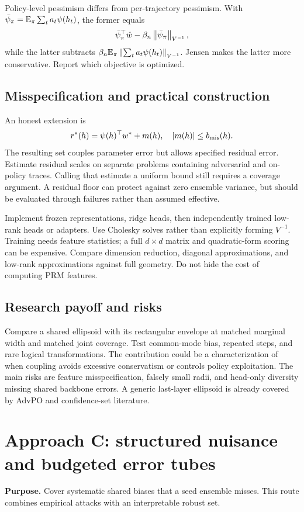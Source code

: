 Policy-level pessimism differs from per-trajectory pessimism. With
$\bar\psi_\pi=\mathbb{E}_\pi\sum_t a_t\psi(h_t)$, the former equals
\[
 \bar\psi_\pi^\top\hat w-\beta_n\left\lVert\bar\psi_\pi\right\rVert_{V^{-1}},
\]
while the latter subtracts
$\beta_n\mathbb{E}_\pi\left\lVert\sum_t a_t\psi(h_t)\right\rVert_{V^{-1}}$.
Jensen makes the latter more conservative. Report which objective is optimized.

\subsection{Misspecification and practical construction}
An honest extension is
\[
 r^*(h)=\psi(h)^\top w^*+m(h),\quad |m(h)|\le b_{\rm mis}(h).
\]
The resulting set couples parameter error but allows specified residual error.
Estimate residual scales on separate problems containing adversarial and
on-policy traces. Calling that estimate a uniform bound still requires a
coverage argument. A residual floor can protect against zero ensemble variance,
but should be evaluated through failures rather than assumed effective.

Implement frozen representations, ridge heads, then independently trained
low-rank heads or adapters. Use Cholesky solves rather than explicitly forming
$V^{-1}$. Training needs feature statistics; a full $d\times d$ matrix and
quadratic-form scoring can be expensive. Compare dimension reduction,
diagonal approximations, and low-rank approximations against full geometry.
Do not hide the cost of computing PRM features.

\subsection{Research payoff and risks}
Compare a shared ellipsoid with its rectangular envelope at matched marginal
width and matched joint coverage. Test common-mode bias, repeated steps, and
rare logical transformations. The contribution could be a characterization of
when coupling avoids excessive conservatism or controls policy exploitation.
The main risks are feature misspecification, falsely small radii, and head-only
diversity missing shared backbone errors. A generic last-layer ellipsoid is
already covered by AdvPO and confidence-set literature.

\section{Approach C: structured nuisance and budgeted error tubes}
\textbf{Purpose.} Cover systematic shared biases that a seed ensemble misses.
This route combines empirical attacks with an interpretable robust set.


